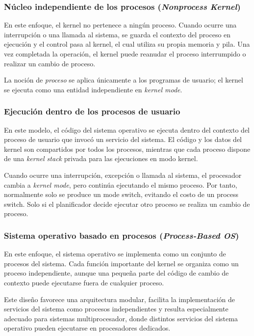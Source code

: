 \subsubsection{Núcleo independiente de los procesos (\textit{Nonprocess Kernel})}

En este enfoque, el kernel no pertenece a ningún proceso. Cuando ocurre una interrupción o una llamada al sistema, se guarda el contexto del proceso en ejecución y el control pasa al kernel, el cual utiliza su propia memoria y pila. Una vez completada la operación, el kernel puede reanudar el proceso interrumpido o realizar un cambio de proceso.

La noción de \textit{proceso} se aplica únicamente a los programas de usuario; el kernel se ejecuta como una entidad independiente en \textit{kernel mode}.

\subsubsection{Ejecución dentro de los procesos de usuario}

En este modelo, el código del sistema operativo se ejecuta dentro del contexto del proceso de usuario que invocó un servicio del sistema. El código y los datos del kernel son compartidos por todos los procesos, mientras que cada proceso dispone de una \textit{kernel stack} privada para las ejecuciones en modo kernel.

Cuando ocurre una interrupción, excepción o llamada al sistema, el procesador cambia a \textit{kernel mode}, pero continúa ejecutando el mismo proceso. Por tanto, normalmente solo se produce un mode switch, evitando el costo de un process switch. Solo si el planificador decide ejecutar otro proceso se realiza un cambio de proceso.

\subsubsection{Sistema operativo basado en procesos (\textit{Process-Based OS})}

En este enfoque, el sistema operativo se implementa como un conjunto de procesos del sistema. Cada función importante del kernel se organiza como un proceso independiente, aunque una pequeña parte del código de cambio de contexto puede ejecutarse fuera de cualquier proceso.

Este diseño favorece una arquitectura modular, facilita la implementación de servicios del sistema como procesos independientes y resulta especialmente adecuado para sistemas multiprocesador, donde distintos servicios del sistema operativo pueden ejecutarse en procesadores dedicados.
